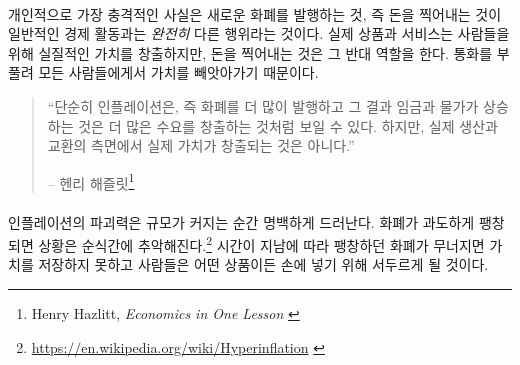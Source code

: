 \paragraph{}
개인적으로 가장 충격적인 사실은 새로운 화폐를 발행하는 것, 즉 돈을 찍어내는 것이 
일반적인 경제 활동과는 \textit{완전히} 다른 행위라는 것이다. 
실제 상품과 서비스는 사람들을 위해 실질적인 가치를 창출하지만, 
돈을 찍어내는 것은 그 반대 역할을 한다. 통화를 부풀려 모든 사람들에게서 가치를 빼앗아가기 때문이다. 

\begin{quotation}\begin{samepage}
		\enquote{단순히 인플레이션은, 즉 화폐를 더 많이 발행하고 그 결과 임금과 물가가 상승하는 것은 
		더 많은 수요를 창출하는 것처럼 보일 수 있다. 하지만, 실제 생산과 교환의 측면에서 실제 가치가 창출되는 것은 아니다.}
		\begin{flushright} -- 헨리 해즐릿\footnote{Henry Hazlitt, \textit{Economics in One Lesson} \cite{hazlitt}}
\end{flushright}\end{samepage}\end{quotation}

\paragraph{}
인플레이션의 파괴력은 규모가 커지는 순간 명백하게 드러난다. 
화폐가 과도하게 팽창되면 상황은 순식간에 추악해진다.\footnote{\url{https://en.wikipedia.org/wiki/Hyperinflation} \cite{wiki:hyperinflation}} 
시간이 지남에 따라 팽창하던 화폐가 무너지면 가치를 저장하지 못하고 
사람들은 어떤 상품이든 손에 넣기 위해 서두르게 될 것이다.

